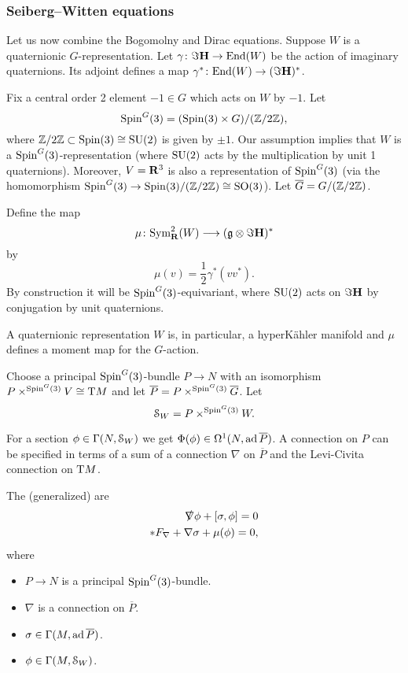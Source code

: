 \subsubsection{Seiberg--Witten equations}

Let us now combine the Bogomolny and Dirac equations. Suppose $W$ is a quaternionic $G$-representation. Let $\gamma\colon \Im{\mathbf{H}}\rightarrow \mathrm{End}(W)$ be the action of imaginary quaternions. Its adjoint defines a map $\gamma^*\colon \mathrm{End}(W)\rightarrow (\Im{\mathbf{H}})^*$.

Fix a central order 2 element $-1\in G$ which acts on $W$ by $-1$. Let
\[\mathrm{Spin}^G(3) = (\mathrm{Spin}(3)\times G)/(\mathbb{Z}/2\mathbb{Z}),\]
where $\mathbb{Z}/2\mathbb{Z}\subset \mathrm{Spin}(3)\cong \mathrm{SU}(2)$ is given by $\pm 1$. Our assumption implies that $W$ is a $\mathrm{Spin}^G(3)$-representation (where $\mathrm{SU}(2)$ acts by the multiplication by unit 1 quaternions). Moreover, $V=\mathbf{R}^3$ is also a representation of $\mathrm{Spin}^G(3)$ (via the homomorphism $\mathrm{Spin}^G(3)\rightarrow \mathrm{Spin}(3)/(\mathbb{Z}/2\mathbb{Z})\cong \mathrm{SO}(3)$). Let $\overline{G} = G/(\mathbb{Z}/2\mathbb{Z})$.

Define the map
\[\mu\colon \mathrm{Sym}^2_{\mathbf{R}}(W)\longrightarrow (\mathfrak{g}\otimes \Im{\mathbf{H}})^*\]
by
\[\mu(v) = \frac{1}{2}\gamma^*(vv^*).\]
By construction it will be $\mathrm{Spin}^G(3)$-equivariant, where $\mathrm{SU}(2)$ acts on $\Im{\mathbf{H}}$ by conjugation by unit quaternions.

\begin{remark}
A quaternionic representation $W$ is, in particular, a hyperK\"ahler manifold and $\mu$ defines a moment map for the $G$-action.
\end{remark}

Choose a principal $\mathrm{Spin}^G(3)$-bundle $P\rightarrow N$ with an isomorphism $P\times^{\mathrm{Spin}^G(3)} V\cong \mathrm{T} M$ and let $\overline{P} = P\times^{\mathrm{Spin}^G(3)} \overline{G}$. Let
\[\mathcal{S}_W = P\times^{\mathrm{Spin}^G(3)} W.\]

For a section $\phi\in\Gamma(N, \mathcal{S}_W)$ we get $\Phi(\phi)\in \Omega^1(N, \operatorname{ad} \overline{P})$. A connection on $P$ can be specified in terms of a sum of a connection $\nabla$ on $\overline{P}$ and the Levi-Civita connection on $\mathrm{T} M$.

\begin{defn}
The (generalized)  are
\begin{eqnarray*}
\slashed{\nabla} \phi + [\sigma, \phi] = 0\\
\ast F_\nabla + \nabla \sigma + \mu(\phi) = 0,
\end{eqnarray*}
where
\begin{itemize}
\item $P\rightarrow N$ is a principal $\mathrm{Spin}^G(3)$-bundle.
\item $\nabla$ is a connection on $\overline{P}$.
\item $\sigma\in\Gamma(M, \operatorname{ad} \overline{P})$.
\item $\phi\in\Gamma(M, \mathcal{S}_W)$.
\end{itemize}
\end{defn}

